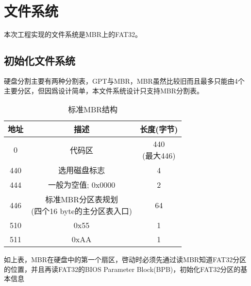 \section{文件系统}

本次工程实现的文件系统是MBR上的FAT32。



\subsection{初始化文件系统}



硬盘分割主要有两种分割表，GPT与MBR，MBR虽然比较旧而且最多只能由4个主要分区，但因爲设计简单，本文件系统设计只支持MBR分割表。


\begin{table}[H]
  \centering
  \caption{标准MBR结构}
  \begin{tabular}{|c|c|c|}
  \hline
  地址 & 描述                                                & 长度(字节)        \\
  \hline
  0    & 代码区                                              & \makecell{440\\(最大446)} \\
  \hline
  440  & 选用磁盘标志                                        & 4                   \\
  \hline
  444  & 一般为空值; 0x0000                                  & 2                   \\
  \hline
  446  & \makecell{标准MBR分区表规划\\(四个16 byte的主分区表入口)} & 64                  \\
  \hline
  510  & 0x55                                                & 1                   \\
  \hline
  511  & 0xAA                                                & 1                   \\
  \hline
  \end{tabular}
\end{table}

如上表，MBR在硬盘中的第一个扇区，啓动时必须先通过读MBR知道FAT32分区的位置，并且再读FAT32的BIOS Parameter Block(BPB)，初始化FAT32分区的基本信息



